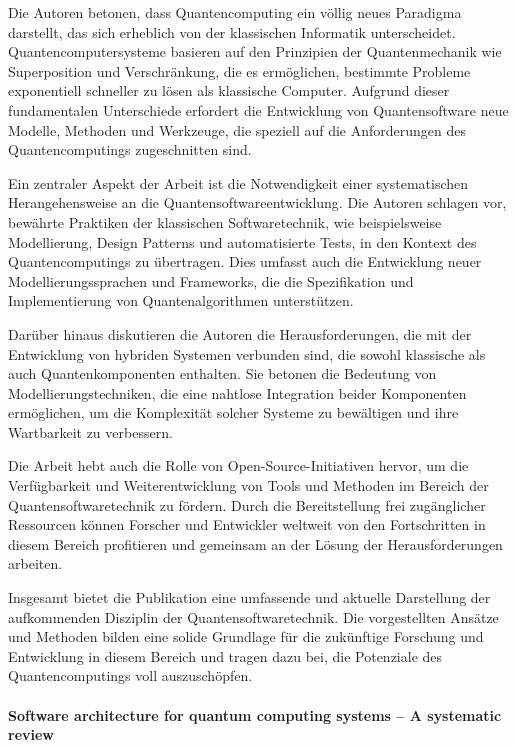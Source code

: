 Die Autoren betonen, dass Quantencomputing ein völlig neues Paradigma darstellt, das sich erheblich von der 
klassischen Informatik unterscheidet. Quantencomputersysteme basieren auf den Prinzipien der Quantenmechanik 
wie Superposition und Verschränkung, die es ermöglichen, bestimmte Probleme exponentiell schneller zu lösen als 
klassische Computer. Aufgrund dieser fundamentalen Unterschiede erfordert die Entwicklung von Quantensoftware neue 
Modelle, Methoden und Werkzeuge, die speziell auf die Anforderungen des Quantencomputings zugeschnitten sind.

Ein zentraler Aspekt der Arbeit ist die Notwendigkeit einer systematischen Herangehensweise an die 
Quantensoftwareentwicklung. Die Autoren schlagen vor, bewährte Praktiken der klassischen Softwaretechnik, wie 
beispielsweise Modellierung, Design Patterns und automatisierte Tests, in den Kontext des Quantencomputings zu 
übertragen. Dies umfasst auch die Entwicklung neuer Modellierungssprachen und Frameworks, die die Spezifikation 
und Implementierung von Quantenalgorithmen unterstützen.

Darüber hinaus diskutieren die Autoren die Herausforderungen, die mit der Entwicklung von hybriden Systemen verbunden 
sind, die sowohl klassische als auch Quantenkomponenten enthalten. Sie betonen die Bedeutung von Modellierungstechniken, 
die eine nahtlose Integration beider Komponenten ermöglichen, um die Komplexität solcher Systeme zu bewältigen und 
ihre Wartbarkeit zu verbessern.

Die Arbeit hebt auch die Rolle von Open-Source-Initiativen hervor, um die Verfügbarkeit und Weiterentwicklung von Tools 
und Methoden im Bereich der Quantensoftwaretechnik zu fördern. Durch die Bereitstellung frei zugänglicher Ressourcen 
können Forscher und Entwickler weltweit von den Fortschritten in diesem Bereich profitieren und gemeinsam an der Lösung 
der Herausforderungen arbeiten.

Insgesamt bietet die Publikation eine umfassende und aktuelle Darstellung der aufkommenden Disziplin der Quantensoftwaretechnik. 
Die vorgestellten Ansätze und Methoden bilden eine solide Grundlage für die zukünftige Forschung und Entwicklung in diesem 
Bereich und tragen dazu bei, die Potenziale des Quantencomputings voll auszuschöpfen.

\paragraph{Software architecture for quantum computing systems – A systematic review}

